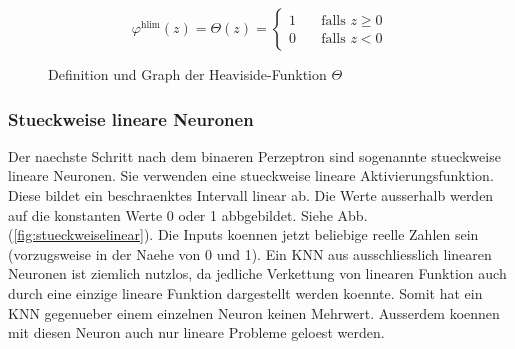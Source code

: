 \begin{figure}[h!]
  \begin{minipage}[h!]{0.5\textwidth}
    \begin{equation*}
      \varphi^{\text{hlim}}(z) = \Theta(z) =
      \begin{cases}
        1 & \quad \text{falls } z \geq 0\\
        0 & \quad \text{falls } z < 0
      \end{cases}
    \end{equation*}

  \end{minipage}
  \begin{minipage}[h!]{0.5\textwidth}
    \centering
  \end{minipage}

  \caption{Definition und Graph der Heaviside-Funktion $\Theta$}
  \label{fig:heaviside}
\end{figure}

\subsubsection{Stueckweise lineare Neuronen}
Der naechste Schritt nach dem binaeren Perzeptron sind sogenannte stueckweise
lineare Neuronen.
Sie verwenden eine stueckweise lineare Aktivierungsfunktion. Diese bildet ein
beschraenktes Intervall linear ab. Die Werte ausserhalb werden auf die
konstanten Werte 0 oder 1 abbgebildet. Siehe Abb. (\ref{fig:stueckweiselinear}).
\para{}
Die Inputs koennen jetzt beliebige reelle Zahlen sein (vorzugsweise in der Naehe
von 0 und 1).
Ein KNN aus ausschliesslich linearen Neuronen ist ziemlich nutzlos, da jedliche Verkettung von
linearen Funktion auch durch eine einzige lineare Funktion dargestellt werden
koennte. Somit hat ein KNN gegenueber einem einzelnen Neuron keinen Mehrwert.
Ausserdem koennen mit diesen Neuron auch nur lineare Probleme geloest werden.

